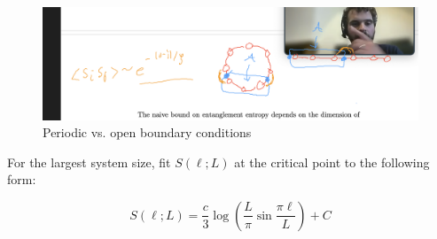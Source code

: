\documentclass[12pt]{article}
\begin{document}
\begin{figure}
\centering
\includegraphics[width=\textwidth]{pbc.png}
\caption{Periodic vs. open boundary conditions}
\end{figure}
\newpage
For the largest system size, fit $S(\ell ; L)$ at the critical point to the following form:


\begin{equation*}
S(\ell ; L)=\frac{c}{3} \log \left(\frac{L}{\pi} \sin \frac{\pi \ell}{L}\right)+C \tag{26}
\end{equation*}
\end{document}
